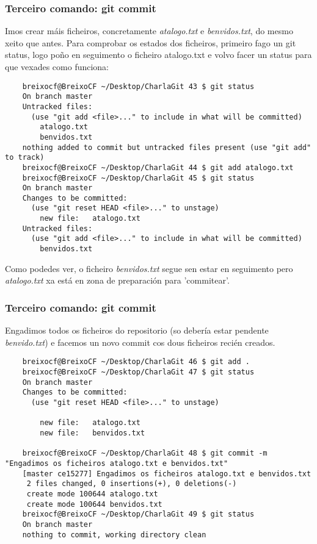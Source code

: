 \begin{frame}[fragile]
  \frametitle{Terceiro comando: git commit}
  \scriptsize
  Imos crear máis ficheiros, concretamente \textit{atalogo.txt} e \textit{benvidos.txt}, do mesmo xeito que antes.
  Para comprobar os estados dos ficheiros, primeiro fago un git status, logo poño en seguimento o ficheiro atalogo.txt e volvo facer un status para que vexades como funciona:
  \tiny 
\begin{verbatim}
	breixocf@BreixoCF ~/Desktop/CharlaGit 43 $ git status
	On branch master
	Untracked files:
	  (use "git add <file>..." to include in what will be committed)
		atalogo.txt
		benvidos.txt
	nothing added to commit but untracked files present (use "git add" to track)
	breixocf@BreixoCF ~/Desktop/CharlaGit 44 $ git add atalogo.txt 
	breixocf@BreixoCF ~/Desktop/CharlaGit 45 $ git status
	On branch master
	Changes to be committed:
	  (use "git reset HEAD <file>..." to unstage)
		new file:   atalogo.txt
	Untracked files:
	  (use "git add <file>..." to include in what will be committed)
		benvidos.txt
\end{verbatim}
  \scriptsize
  Como podedes ver, o ficheiro \textit{benvidos.txt} segue sen estar en seguimento pero \textit{atalogo.txt} xa está en zona de preparación para 'commitear'. 
\end{frame}

\begin{frame}[fragile]
  \frametitle{Terceiro comando: git commit}
  \scriptsize
  Engadimos todos os ficheiros do repositorio (so debería estar pendente \textit{benvido.txt}) e facemos un novo commit cos dous ficheiros recién creados.
  \tiny 
\begin{verbatim}
	breixocf@BreixoCF ~/Desktop/CharlaGit 46 $ git add .
	breixocf@BreixoCF ~/Desktop/CharlaGit 47 $ git status
	On branch master
	Changes to be committed:
	  (use "git reset HEAD <file>..." to unstage)
	
		new file:   atalogo.txt
		new file:   benvidos.txt
	
	breixocf@BreixoCF ~/Desktop/CharlaGit 48 $ git commit -m "Engadimos os ficheiros atalogo.txt e benvidos.txt"
	[master ce15277] Engadimos os ficheiros atalogo.txt e benvidos.txt
	 2 files changed, 0 insertions(+), 0 deletions(-)
	 create mode 100644 atalogo.txt
	 create mode 100644 benvidos.txt
	breixocf@BreixoCF ~/Desktop/CharlaGit 49 $ git status
	On branch master
	nothing to commit, working directory clean
	
\end{verbatim}
  \scriptsize 
\end{frame}

